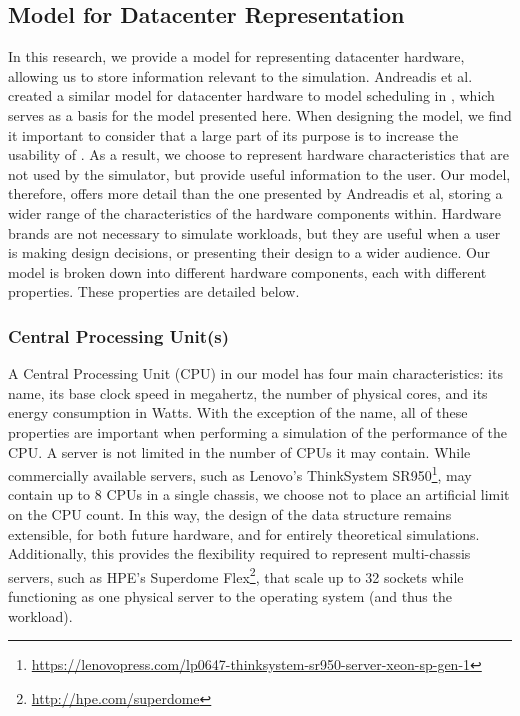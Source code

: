\documentclass[11pt]{article}
\begin{document}
	\subsection{Model for Datacenter Representation}
		In this research, we provide a model for representing datacenter hardware, allowing us to store information  relevant to the simulation. Andreadis et al. created a similar model for datacenter hardware to model scheduling in \opendc{} \cite{Andreadis2018}, which serves as a basis for the model presented here. 
		When designing the model, we find it important to consider that a large part of its purpose is to increase the usability of \opendc{}. 
		As a result, we choose to represent hardware characteristics that are not used by the simulator, but provide useful information to the user. 
		Our model, therefore, offers more detail than the one presented by Andreadis et al, storing a wider range of the characteristics of the hardware components within.
		Hardware brands are not necessary to simulate workloads, but they are useful when a user is making design decisions, or presenting their design to a wider audience.
		Our model is broken down into different hardware components, each with different properties.
		These properties are detailed below.

		\subsubsection{Central Processing Unit(s)}
			A Central Processing Unit (CPU) in our model has four main characteristics: its name, its base clock speed in megahertz, the number of physical cores, and its energy consumption in Watts.
			With the exception of the name, all of these properties are important when performing a simulation of the performance of the CPU.
			A server is not limited in the number of CPUs it may contain.
			While commercially available servers, such as Lenovo's ThinkSystem SR950\footnote{\url{https://lenovopress.com/lp0647-thinksystem-sr950-server-xeon-sp-gen-1}}, may contain up to 8 CPUs in a single chassis, we choose not to place an artificial limit on the CPU count.
			In this way, the design of the data structure remains extensible, for both future hardware, and for entirely theoretical simulations.
			Additionally, this provides the flexibility required to represent multi-chassis servers, such as HPE's Superdome Flex\footnote{\url{http://hpe.com/superdome}}, that scale up to 32 sockets while functioning as one physical server to the operating system (and thus the workload).
\end{document}
